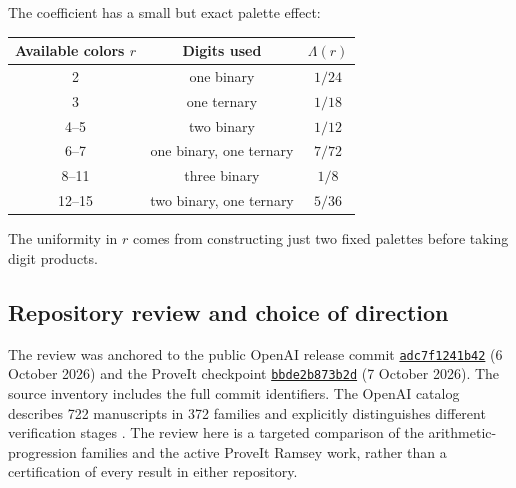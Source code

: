 The coefficient has a small but exact palette effect:
\begin{center}
\begin{tabular}{@{}c c c@{}}
\toprule
Available colors \(r\)&Digits used&\(\Lambda(r)\)\\
\midrule
2&one binary&\(1/24\)\\
3&one ternary&\(1/18\)\\
4--5&two binary&\(1/12\)\\
6--7&one binary, one ternary&\(7/72\)\\
8--11&three binary&\(1/8\)\\
12--15&two binary, one ternary&\(5/36\)\\
\bottomrule
\end{tabular}
\end{center}
The uniformity in \(r\) comes from constructing just two fixed
palettes before taking digit products.

\subsection{Repository review and choice of direction}

The review was anchored to the public OpenAI release commit
\href{https://github.com/openai/math/commit/adc7f1241b42e322a6451854ab7e4b4c146bf78a}{\texttt{adc7f1241b42}}
(6 October 2026) and the ProveIt checkpoint
\href{https://github.com/VladimirReshetnikov/ProveIt/commit/bbde2b873b2dc7b48af1730926452bdda18bf9c8}{\texttt{bbde2b873b2d}}
(7 October 2026). The source inventory includes the full commit identifiers.
The OpenAI catalog describes 722 manuscripts in 372 families and
explicitly distinguishes different verification stages
\cite{openaiReadme,openaiContents}.
The review here is a targeted comparison of the arithmetic-progression
families and the active ProveIt Ramsey work, rather than a certification
of every result in either repository.

